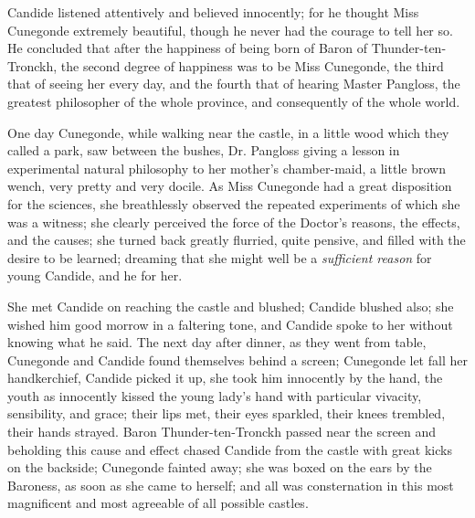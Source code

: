 Candide listened attentively and believed innocently; for he thought Miss Cunegonde extremely beautiful, though he never had the courage to tell her so. He concluded that after the happiness of being born of Baron of Thunder-ten-Tronckh, the second degree of happiness was to be Miss Cunegonde, the third that of seeing her every day, and the fourth that of hearing Master Pangloss, the greatest philosopher of the whole province, and consequently of the whole world.

One day Cunegonde, while walking near the castle, in a little wood which they called a park, saw between the bushes, Dr. Pangloss giving a lesson in experimental natural philosophy to her mother's chamber-maid, a little brown wench, very pretty and very docile. As Miss Cunegonde had a great disposition for the sciences, she breathlessly observed the repeated experiments of which she was a witness; she clearly perceived the force of the Doctor's reasons, the effects, and the causes; she turned back greatly flurried, quite pensive, and filled with the desire to be learned; dreaming that she might well be a \textit{sufficient reason} for young Candide, and he for her.

She met Candide on reaching the castle and blushed; Candide blushed also; she wished him good morrow in a faltering tone, and Candide spoke to her without knowing what he said. The next day after dinner, as they went from table, Cunegonde and Candide found themselves behind a screen; Cunegonde let fall her handkerchief, Candide picked it up, she took him innocently by the hand, the youth as innocently kissed the young lady's hand with particular vivacity, sensibility, and grace; their lips met, their eyes sparkled, their knees trembled, their hands strayed. Baron Thunder-ten-Tronckh passed near the screen and beholding this cause and effect chased Candide from the castle with great kicks on the backside; Cunegonde fainted away; she was boxed on the ears by the Baroness, as soon as she came to herself; and all was consternation in this most magnificent and most agreeable of all possible castles.

